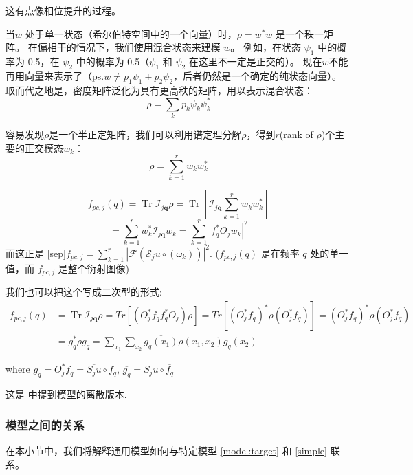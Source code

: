 \documentclass[12pt]{article}
\begin{document}
这有点像相位提升的过程。



当$w$ 处于单一状态（希尔伯特空间中的一个向量）时，$\rho=w^*w$ 是一个秩一矩阵。 在偏相干的情况下，我们使用混合状态来建模 $w$。 例如，在状态 $\psi_1$ 中的概率为 0.5，在 $\psi_2$ 中的概率为 0.5（$\psi_1$ 和 $\psi_2$ 在这里不一定是正交的）。 现在$w$不能再用向量来表示了（ps.$w \neq p_1\psi_1 + p_2 \psi_2$，后者仍然是一个确定的纯状态向量）。 取而代之地是，密度矩阵泛化为具有更高秩的矩阵，用以表示混合状态：
$$
\rho = \sum_k p_k \psi_k \psi_k^*
$$



容易发现$\rho$是一个半正定矩阵，我们可以利用谱定理分解$\rho$，得到$r$(rank of $\rho$)个主要的正交模态$w_k$：
\begin{equation}
\label{ort}
\rho = \sum_{k=1}^{r} w_k w_k^*
\end{equation}



$$
f_{pc,j}(q) = \operatorname{Tr} \mathcal{I}_{j \mathbf{q}} \rho
= \operatorname{Tr}[ \mathcal{I}_{j \mathbf{q}}  \sum_{k=1}^{r} w_k w_k^*]
$$
$$
=
\sum_{k=1}^r w_k^*\mathcal{I}_{j \mathbf{q}} w_k 
=
\sum_{k=1}^r |f_q^*O_j w_k|^2 
$$
而这正是 \eqref{sep}$
f_{pc,j}=\sum_{k=1}^r \left|\mathcal{F}\left( \mathcal{S}_{j} u \circ \left(\omega_k\right) \right)\right|^{2}  
$. ($f_{pc,j}(q)$ 是在频率 $q$ 处的单一值，而 $f_{pc,j}$ 是整个衍射图像)

我们也可以把这个写成二次型的形式:
\begin{equation}
\label{quadratic}
\begin{aligned}
f_{pc,j}(q) &=  \operatorname{Tr} \mathcal{I}_{j \mathbf{q}} \rho =Tr[(O_j^*f_qf_q^*O_j)\rho]
= Tr[(O_j^*f_q)^*\rho (O_j^*f_q)] = (O_j^*f_q)^*\rho (O_j^*f_q) \\
&= g_q^* \rho g_q = \sum_{x_1} \sum _{x_2}  \overline{g_q(x_1)} \rho(x_1,x_2) g_q(x_2)
\end{aligned}
\end{equation}

where $g_q = O_j^*f_q =  \overline{S_ju} \circ f_q$, $\overline{g_q} = S_ju \circ \overline{f_q}$

这是  \cite{psf}中提到模型的离散版本.  

\subsubsection{模型之间的关系}
\label{section:reference}
在本小节中，我们将解释通用模型如何与特定模型 \eqref{model:target} 和 \eqref{simple} 联系。
\end{document}
